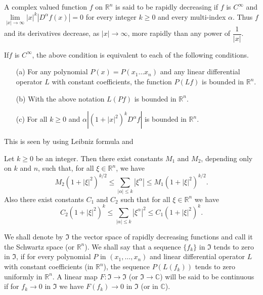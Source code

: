 A complex valued function $f$ on $\mathbb{R}^{n}$ is said to be
rapidly decreasing if $f$ is $C^{\infty}$ and $\lim\limits_{|x|\to
  \infty}|x|^{k}|D^{\alpha}f(x)|=0$ for every integer $k\geq 0$ and
every multi-index $\alpha$. Thus $f$ and its derivatives decrease, as
$|x|\to \infty$, more rapidly than any power of $\dfrac{1}{|x|}$.

If\pageoriginale $f$ is $C^{\infty}$, the above condition is
equivalent to each of the following conditions.
\begin{itemize}
\item[(a)] For any polynomial $P(x)=P(x_{1}\ldots x_{n})$ and any
  linear differential operator $L$ with constant coefficients, the
  function $P(Lf)$ is bounded in $\mathbb{R}^{n}$.

\item[(b)] With the above notation $L(Pf)$ is bounded in
  $\mathbb{R}^{n}$.

\item[(c)] For all $k\geq 0$ and $\alpha |(1+|x|^{2})^{k}D^{\alpha}f|$
  is bounded in $\mathbb{R}^{n}$.
\end{itemize}

This is seen by using Leibniz formula and

\begin{exer*}
Let $k\geq 0$ be an integer. Then there exist constants $M_{1}$ and
$M_{2}$, depending only on $k$ and $n$, such that, for all $\xi\in
\mathbb{R}^{n}$, we have
$$
M_{2}(1+|\xi|^{2})^{k/2}\leq \sum\limits_{|\alpha|\leq
  k}|\xi^{\alpha}|\leq M_{1}(1+|\xi|^{2})^{k/2}.
$$
Also there exist constants $C_{1}$ and $C_{2}$ such that for all $\xi
\in \mathbb{R}^{n}$ we have
$$
C_{2}(1+|\xi|^{2})^{k}\leq \sum\limits_{|\alpha|\leq
  k}|\xi^{\alpha}|^{2}\leq C_{1}(1+|\xi|^{2})^{k}.
$$

We shall denote by $\mathfrak{I}$ the vector space of rapidly
decreasing functions and call it the Schwartz space (or
$\mathbb{R}^{n}$). We shall say that a sequence $\{f_{k}\}$ in
$\mathfrak{I}$ tends to zero in $\mathfrak{I}$, if for every
polynomial $P$ in $(x_{1},\ldots,x_{n})$ and linear differential
operator $L$ with constant coefficients (in $\mathbb{R}^{n}$), the
sequence $P(L(f_{k}))$ tends to zero uniformly in $\mathbb{R}^{n}$. A
linear map $F:\mathfrak{I}\to \mathfrak{I}$ (or $\mathfrak{I}\to
\mathbb{C}$) will be said to be continuous if for $f_{k}\to 0$ in
$\mathfrak{I}$ we have $F(f_{k})\to 0$ in $\mathfrak{I}$ (or in $\mathbb{C}$).
\end{exer*}

